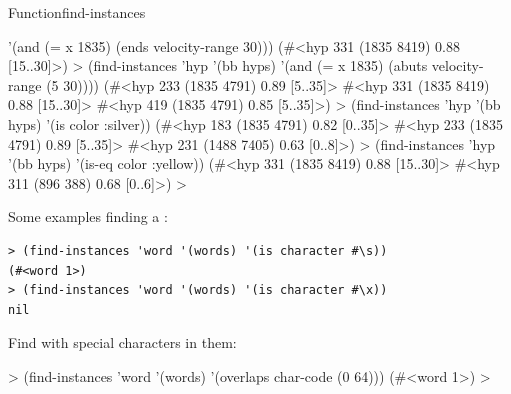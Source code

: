 \documentclass[10pt,twoside,english,pdftex]{article}
\begin{document}
\begin{functiondoc}{Function}{find-instances}
\begin{example}
      '(and (= x 1835) (ends velocity-range 30)))
  (#<hyp 331 (1835 8419) 0.88 [15..30]>)
  > (find-instances 'hyp '(bb hyps) 
      '(and (= x 1835) (abuts velocity-range (5 30))))
  (#<hyp 233 (1835 4791) 0.89 [5..35]>
   #<hyp 331 (1835 8419) 0.88 [15..30]>
   #<hyp 419 (1835 4791) 0.85 [5..35]>)\goodpagebreak
 > (find-instances 'hyp '(bb hyps) 
      '(is color :silver))
  (#<hyp 183 (1835 4791) 0.82 [0..35]> 
   #<hyp 233 (1835 4791) 0.89 [5..35]>
   #<hyp 231 (1488 7405) 0.63 [0..8]>)
  > (find-instances 'hyp '(bb hyps) 
      '(is-eq color :yellow))
  (#<hyp 331 (1835 8419) 0.88 [15..30]> 
   #<hyp 311 (896 388) 0.68 [0..6]>)
  >
\end{example}

Some examples finding a  :
%
\W\supp
\begin{verbatim}
> (find-instances 'word '(words) '(is character #\s))
(#<word 1>)
> (find-instances 'word '(words) '(is character #\x))
nil
\end{verbatim}
%
Find   with special characters in them:
%
\W\supp\notpretop
\begin{example}
  > (find-instances 'word '(words) '(overlaps char-code (0 64)))
  (#<word 1>)
  >
\end{example}

\fnnote
\patternnote

\end{functiondoc}

\end{document}
